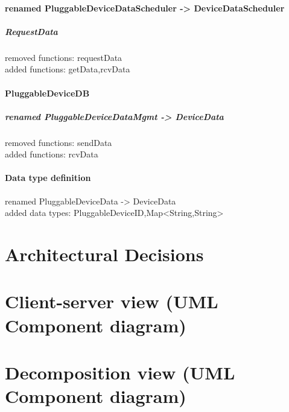 \documentclass[english]{sareport}
\begin{document}
        \subsubsection{renamed PluggableDeviceDataScheduler -> DeviceDataScheduler}
            \paragraph{RequestData}
            removed functions: requestData\\
            added functions: getData,rcvData
           
        \subsubsection{PluggableDeviceDB}
            \paragraph{renamed PluggableDeviceDataMgmt -> DeviceData}
            removed functions: sendData\\
            added functions: rcvData

        \subsubsection{Data type definition}
            renamed PluggableDeviceData -> DeviceData\\
            added data types: PluggableDeviceID,Map<String,String>

                                         
\chapter{Architectural Decisions}\label{ch:overview}
    
    \clearpage

\chapter{Client-server view (UML Component diagram)}\label{ch:client-server}
    \minilof
    
    \clearpage

\chapter{Decomposition view (UML Component diagram)}\label{ch:decomposition}
    \minilof
    
    \clearpage
\end{document}
